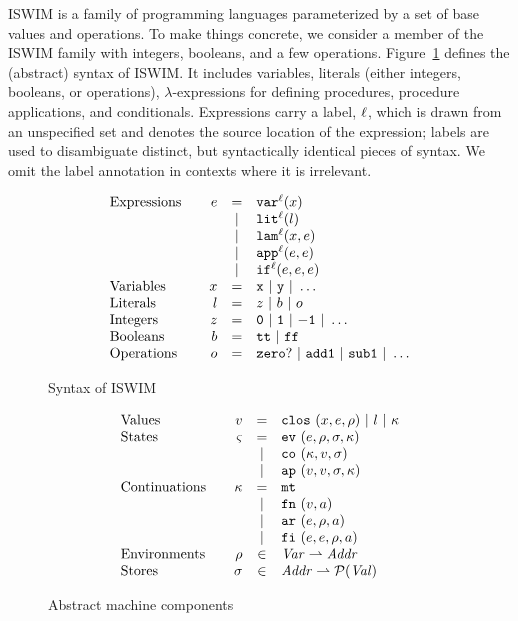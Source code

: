 \documentclass[preprint,onecolumn,9pt]{sigplanconf} %
\begin{document}
ISWIM is a family of programming languages parameterized by a set of
base values and operations.  To make things concrete, we consider a
member of the ISWIM family with integers, booleans, and a few
operations.
%
Figure~\ref{fig:syntax} defines the (abstract) syntax of ISWIM.  It
includes variables, literals (either integers, booleans, or
operations), $\lambda$-expressions for defining procedures, procedure
applications, and conditionals.  Expressions carry a label, ${\ell}$,
which is drawn from an unspecified set and denotes the source location
of the expression; labels are used to disambiguate distinct, but
syntactically identical pieces of syntax.  We omit the label
annotation in contexts where it is irrelevant.

\begin{figure}
\[
\begin{array}{l@{\qquad}rcl}
\text{Expressions} & \mexp &=& \svar[^\mlab]\mvar\\
&&|& \slit[^\mlab]\mlit\\
&&|& \slam[^\mlab]\mvar\mexp\\
&&|& \sapp[^\mlab]\mexp\mexp \\
&&|& \sif[^\mlab]\mexp\mexp\mexp \\
\text{Variables}&\mvar &=& \syntax{x}\ |\ \syntax{y}\ |\ \dots\\
\text{Literals}&\mlit &=& \mnum\ |\ \mbln\ |\ \mop\\
\text{Integers}&\mnum &=& \syntax{0}\ |\ \syntax{1}\ |\ \syntax{-1}\ |\ \dots\\
\text{Booleans}&\mbln &=& \strue\ |\ \sfalse\\
\text{Operations}&\mop &=& \syntax{zero?}\ |\ \syntax{add1}\ |\ \syntax{sub1}\ |\ \dots
\end{array}
\]
\caption{Syntax of ISWIM}
\label{fig:syntax}
\end{figure}

\begin{figure}
\[
\begin{array}{l@{\qquad}rcl}
\text{Values} & \mval   &=& \clos{\mvar,\mexp,\menv}\ |\ \mlit\ |\ \mkont\\
\text{States} & \mstate &=& \ev{\mexp,\menv,\msto,\mkont}\\
                       &&|& \co{\mkont,\mval,\msto}\\
                       &&|& \ap{\mval,\mval,\msto,\mkont}\\
\text{Continuations} & \mkont &=& \kmt\\
&&|& \kfn{\mval,\maddr}\\
&&|& \kar{\mexp,\menv,\maddr}\\
&&|& \kif{\mexp,\mexp,\menv,\maddr}\\
\text{Environments} &\menv&\in& \mathit{Var} \rightharpoonup \mathit{Addr}\\
\text{Stores} &\msto&\in& \mathit{Addr} \rightharpoonup \mathcal{P}(\mathit{Val})
\end{array}
\]
\caption{Abstract machine components}
\end{figure}
\end{document}
